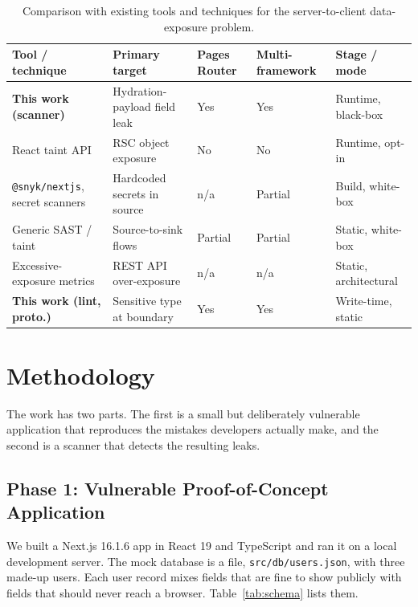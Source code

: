 \documentclass[runningheads]{llncs}
\begin{document}
\begin{table}[tbp]
  \caption{Comparison with existing tools and techniques for the
    server-to-client data-exposure problem.}
  \label{tab:toolcmp}
  \centering
  \small
  \setlength{\tabcolsep}{4pt}
  \begin{tabular}{p{2.7cm}p{2.5cm}p{1.1cm}p{1.3cm}p{2.1cm}}
    \toprule
    \textbf{Tool / technique} & \textbf{Primary target} &
    \textbf{Pages Router} & \textbf{Multi-frame\-work} &
    \textbf{Stage / mode} \\
    \midrule
    \textbf{This work (scanner)} & Hydration-payload field leak &
    Yes & Yes & Runtime, black-box \\
    React taint API~\cite{react_taint} & RSC object exposure &
    No & No & Runtime, opt-in \\
    \texttt{@snyk/nextjs}, secret scanners & Hardcoded secrets in source &
    n/a & Partial & Build, white-box \\
    Generic SAST / taint~\cite{siexvults2025} & Source-to-sink flows &
    Partial & Partial & Static, white-box \\
    Excessive-exposure metrics~\cite{genfer2022} & REST API over-exposure &
    n/a & n/a & Static, architectural \\
    \textbf{This work (lint, proto.)} & Sensitive type at boundary &
    Yes & Yes & Write-time, static \\
    \bottomrule
  \end{tabular}
\end{table}

\section{Methodology}
\label{sec:methodology}

The work has two parts.  The first is a small but deliberately vulnerable
application that reproduces the mistakes developers actually make, and the
second is a scanner that detects the resulting leaks.

\subsection{Phase 1: Vulnerable Proof-of-Concept Application}

We built a Next.js 16.1.6 app in React 19 and TypeScript and ran it on a
local development server.  The mock database is a file,
\texttt{src/db/users.json}, with three made-up users.  Each user record
mixes fields that are fine to show publicly with fields that should never
reach a browser.  Table~\ref{tab:schema} lists them.
\end{document}
